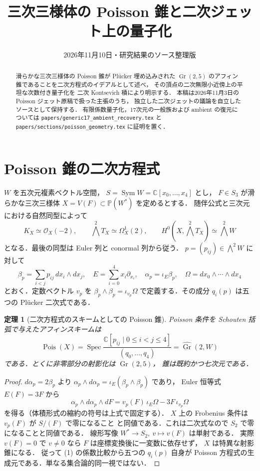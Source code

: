 \documentclass[11pt,a4paper]{ltjsarticle}
\title{三次三様体の Poisson 錐と二次ジェット上の量子化}
\author{}
\date{2026年11月10日・研究結果のソース整理版}
\newtheorem{theorem}{定理}[section]
\newcommand{\C}{\mathbb C}
\newcommand{\PP}{\mathbb P}
\newcommand{\Spec}{\operatorname{Spec}}
\newcommand{\Sym}{\operatorname{Sym}}
\newcommand{\Gr}{\operatorname{Gr}}
\begin{document}
\maketitle
\begin{abstract}
滑らかな三次三様体の Poisson 錐が Pl\"ucker 埋め込みされた
$\Gr(2,5)$ のアフィン錐であることを二次方程式のイデアルとして述べ，
その頂点の二次無限小近傍上の平坦な次数付き量子化を
二次 Kontsevich 積により明示する．
本稿は2026年11月3日の Poisson ジェット原稿で扱った主張のうち，
独立した二次ジェットの議論を自立したソースとして保持する．
有限係数量子化，17次元の一般族および ambient の復元については
\texttt{papers/generic17\_ambient\_recovery.tex} と
\texttt{papers/sections/poisson\_geometry.tex} に証明を置く．
\end{abstract}
\section{Poisson 錐の二次方程式}
$W$ を五次元複素ベクトル空間，
$S=\Sym W=\C[x_0,\ldots,x_4]$ とし，
$F\in S_3$ が滑らかな三次三様体
$X=V(F)\subset\PP(W^*)$ を定めるとする．
随伴公式と三次元における自然同型によって
\[
K_X\simeq\mathcal O_X(-2),\qquad
\bigwedge^2T_X\simeq\Omega_X^1(2),\qquad
H^0(X,\bigwedge^2T_X)\simeq\bigwedge^2W
\]
となる．最後の同型は Euler 列と conormal 列から従う．
$p=(p_{ij})\in\bigwedge^2W$ に対して
\[
\beta_p=\sum_{i<j}p_{ij}\,dx_i\wedge dx_j,\quad
E=\sum_{i=0}^4x_i\partial_{x_i},\quad
\alpha_p=\iota_E\beta_p,\quad
\Omega=dx_0\wedge\cdots\wedge dx_4
\]
とおく．定数ベクトル $v_p$ を
$\beta_p\wedge\beta_p=\iota_{v_p}\Omega$
で定義する．その成分 $q_i(p)$ は五つの Pl\"ucker 二次式である．

\begin{theorem}[二次方程式のスキームとしての Poisson 錐]
\label{thm:cone}
Poisson 条件を Schouten 括弧で与えたアフィンスキームは
\[
\operatorname{Pois}(X)
=\Spec\frac{\C[p_{ij}\mid0\le i<j\le4]}
{(q_0,\ldots,q_4)}
=\widehat{\Gr}(2,W)
\]
である．とくに非零部分の射影化は $\Gr(2,5)$，
錐は既約かつ七次元である．
\end{theorem}
\begin{proof}
$d\alpha_p=2\beta_p$ より
$\alpha_p\wedge d\alpha_p=\iota_E(\beta_p\wedge\beta_p)$ であり，
Euler 恒等式 $E(F)=3F$ から
\[
\alpha_p\wedge d\alpha_p\wedge dF
=v_p(F)\,\iota_E\Omega-3F\,\iota_{v_p}\Omega
\tag{1}
\]
を得る（体積形式の縮約の符号は上式で固定する）．
$X$ 上の Frobenius 条件は $v_p(F)$ が $S/(F)$ で零になること
と同値である．これは二次式なので $S_2$ で零になることと同値である．
線形写像 $W^*\to S_2,\ v\mapsto v(F)$ は単射である．
実際 $v(F)=0$ で $v\ne0$ なら $F$ は座標変換後に一変数に依存せず，
$X$ は特異な射影錐になる．
従って (1) の係数比較から五つの $q_i(p)$ 自身が
Poisson 方程式の生成元である．単なる集合論的同一視ではない．
\end{proof}
\end{document}
